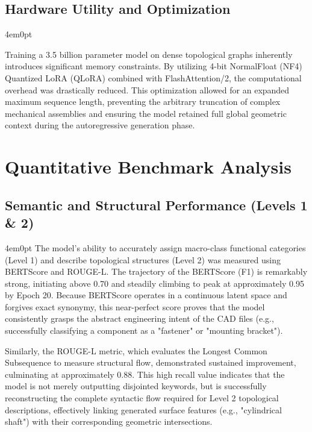 \subsection{Hardware Utility and Optimization}
\begin{indentedblock}{4em}{0pt}

	Training a 3.5 billion parameter model on dense topological graphs inherently introduces significant memory constraints. By utilizing 4-bit NormalFloat (NF4) Quantized LoRA (QLoRA) combined with FlashAttention\-/2, the computational overhead was drastically reduced. This optimization allowed for an expanded maximum sequence length, preventing the arbitrary truncation of complex mechanical assemblies and ensuring the model retained full global geometric context during the autoregressive generation phase.
	
\end{indentedblock}

\section{Quantitative Benchmark Analysis}

\subsection{Semantic and Structural Performance (Levels 1 \& 2)}
\begin{indentedblock}{4em}{0pt}
	The model's ability to accurately assign macro-class functional categories (Level 1) and describe topological structures (Level 2) was measured using BERTScore and ROUGE-L. The trajectory of the BERTScore (F1) is remarkably strong, initiating above 0.70 and steadily climbing to peak at approximately 0.95 by Epoch 20. Because BERTScore operates in a continuous latent space and forgives exact synonymy, this near-perfect score proves that the model consistently grasps the abstract engineering intent of the CAD files (e.g., successfully classifying a component as a "fastener" or "mounting bracket").
	
	
	Similarly, the ROUGE-L metric, which evaluates the Longest Common Subsequence to measure structural flow, demonstrated sustained improvement, culminating at approximately 0.88. This high recall value indicates that the model is not merely outputting disjointed keywords, but is successfully reconstructing the complete syntactic flow required for Level 2 topological descriptions, effectively linking generated surface features (e.g., "cylindrical shaft") with their corresponding geometric intersections.
\end{indentedblock}

